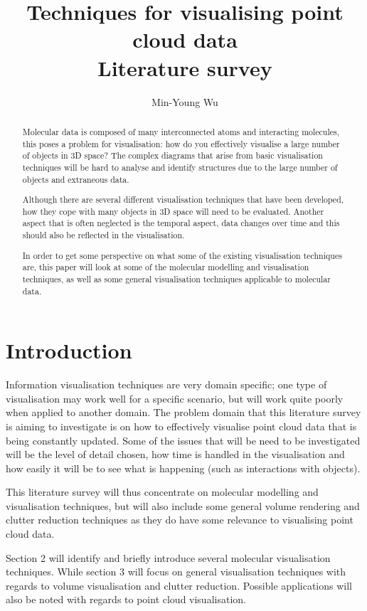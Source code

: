 \documentclass[a4paper]{article}
\title{Techniques for visualising point cloud data \\ Literature survey}
\author{Min-Young Wu}
\begin{document}
\maketitle

\begin{abstract}
Molecular data is composed of many interconnected atoms and interacting
molecules, this poses a problem for visualisation: how do you effectively
visualise a large number of objects in 3D space? The complex diagrams that arise
from basic visualisation techniques will be hard to analyse and identify
structures due to the large number of objects and extraneous data.

Although there are several different visualisation techniques that have been
developed, how they cope with many objects in 3D space will need to be
evaluated. Another aspect that is often neglected is the temporal aspect, data
changes over time and this should also be reflected in the visualisation.

In order to get some perspective on what some of the existing visualisation
techniques are, this paper will look at some of the molecular modelling and
visualisation techniques, as well as some general visualisation techniques
applicable to molecular data.
\end{abstract}


\section{Introduction}

Information visualisation techniques are very domain specific; one type of
visualisation may work well for a specific scenario, but will work quite poorly
when applied to another domain. The problem domain that this literature survey
is aiming to investigate is on how to effectively visualise point cloud data
that is being constantly updated. Some of the issues that will be need to be
investigated will be the level of detail chosen, how time is handled in the
visualisation and how easily it will be to see what is happening (such as
interactions with objects).

This literature survey will thus concentrate on molecular modelling and
visualisation techniques, but will also include some general volume rendering
and clutter reduction techniques as they do have some relevance to visualising
point cloud data.

Section 2 will identify and briefly introduce several molecular visualisation
techniques. While section 3 will focus on general visualisation techniques with
regards to volume visualisation and clutter reduction. Possible applications
will also be noted with regards to point cloud visualisation.
\end{document}
